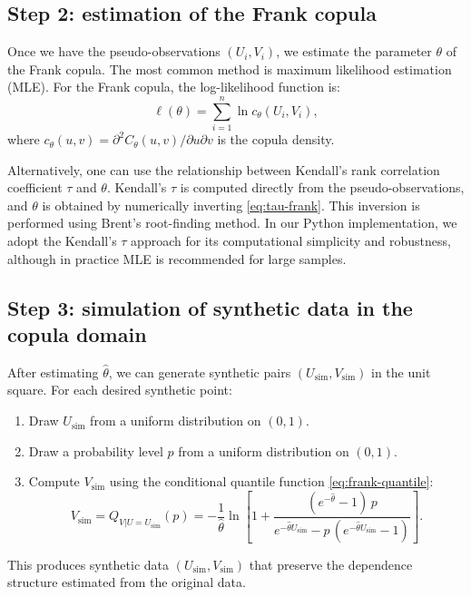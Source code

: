 \subsection{Step 2: estimation of the Frank copula}

Once we have the pseudo-observations \((U_i,V_i)\), we estimate the parameter \(\theta\) of the Frank copula. The most common method is maximum likelihood estimation (MLE). For the Frank copula, the log-likelihood function is:
\begin{equation}
\ell(\theta) = \sum_{i=1}^n \ln c_\theta(U_i,V_i),
\label{eq:frank-loglik}
\end{equation}
where \(c_\theta(u,v) = \partial^2 C_\theta(u,v)/\partial u \partial v\) is the copula density.

Alternatively, one can use the relationship between Kendall's rank correlation coefficient \(\tau\) and \(\theta\). Kendall's \(\tau\) is computed directly from the pseudo-observations, and \(\theta\) is obtained by numerically inverting \eqref{eq:tau-frank}. This inversion is performed using Brent's root-finding method. In our Python implementation, we adopt the Kendall's \(\tau\) approach for its computational simplicity and robustness, although in practice MLE is recommended for large samples.

\subsection{Step 3: simulation of synthetic data in the copula domain}

After estimating \(\hat{\theta}\), we can generate synthetic pairs \((U_{\text{sim}}, V_{\text{sim}})\) in the unit square. For each desired synthetic point:
\begin{enumerate}
    \item Draw \(U_{\text{sim}}\) from a uniform distribution on \((0,1)\).
    \item Draw a probability level \(p\) from a uniform distribution on \((0,1)\).
    \item Compute \(V_{\text{sim}}\) using the conditional quantile function \eqref{eq:frank-quantile}:
    \[
    V_{\text{sim}} = Q_{V|U=U_{\text{sim}}}(p) = -\frac{1}{\hat{\theta}}\ln\left[1+\frac{(e^{-\hat{\theta}}-1)\,p}{e^{-\hat{\theta}U_{\text{sim}}}-p\,(e^{-\hat{\theta}U_{\text{sim}}}-1)}\right].
    \]
\end{enumerate}
This produces synthetic data \((U_{\text{sim}}, V_{\text{sim}})\) that preserve the dependence structure estimated from the original data.

